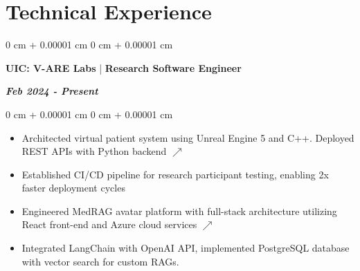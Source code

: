\documentclass[10pt, letterpaper]{article}
\newenvironment{highlights}{
    \begin{itemize}[
        topsep=0.10 cm,
        parsep=0.10 cm,
        partopsep=0pt,
        itemsep=0pt,
        leftmargin=0 cm + 10pt
    ]
}{
    \end{itemize}
} %
\newenvironment{onecolentry}{
    \begin{adjustwidth}{
        0 cm + 0.00001 cm
    }{
        0 cm + 0.00001 cm
    }
}{
    \end{adjustwidth}
} %
\newenvironment{twocolentry}[2][]{
    \onecolentry
    \def\secondColumn{#2}
    \setcolumnwidth{\fill, 4.5 cm}
    \begin{paracol}{2}
}{
    \switchcolumn \raggedleft \secondColumn
    \end{paracol}
    \endonecolentry
} %
\begin{document}
    \section{Technical Experience}
        
\begin{twocolentry}{\textit{\textbf{Feb 2024 - Present}}}
   \textbf{UIC: V-ARE Labs} | \textbf{Research Software Engineer}
\end{twocolentry}
\vspace{0.10 cm}
\begin{onecolentry}
    \begin{highlights}
\item Architected virtual patient system using Unreal Engine 5 and C++. Deployed REST APIs with Python backend \href{https://github.com/PranavMishra17/EQUITY-VirtualPatient-UE5}{\textbf{$\nearrow$}}

    \end{highlights}
\begin{highlights}
\item Established CI/CD pipeline for research participant testing, enabling 2x faster deployment cycles
    \end{highlights}
    \begin{highlights}
\item Engineered MedRAG avatar platform with full-stack architecture utilizing React front-end and Azure cloud services \href{https://github.com/PranavMishra17/MedRAG-Avatar-Platform-IVORY}{\textbf{$\nearrow$}}
    \end{highlights}
\begin{highlights}
\item Integrated LangChain with OpenAI API, implemented PostgreSQL database with vector search for custom RAGs.
\end{highlights}
\end{onecolentry}

\vspace{0.10 cm}
\end{document}
